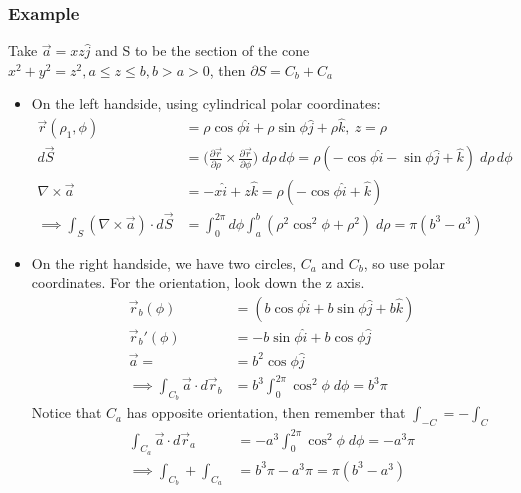 \documentclass[a4paper, 11pt, normalem]{report}
\newcommand\p{\partial}
\newcommand\vr{\vec{r}}
\newcommand\vs{\vec{S}}
\newcommand\va{\vec{a}}
\begin{document}
\subsection{Example}
Take $\va = xz\hat{j}$ and S to be the section of the cone $x^2 + y^2 = z^2, a \leq z \leq b, b > a > 0$, then $\p S = C_b + C_a$
\begin{itemize}
    \item On the left handside, using cylindrical polar coordinates:
            \begin{align*}
                \vr(\rho_1, \phi) &= \rho\cos\phi \hat{i} + \rho\sin\phi \hat{j} + \rho \hat{k},~ z = \rho \\
                d\vs &= \Big(\frac{\p \vr}{\p \rho} \times \frac{\p \vr}{\p \phi}\Big)\;d\rho\,d\phi = \rho(-\cos\phi \hat{i} - \sin\phi \hat{j} + \hat{k})\;d\rho\,d\phi \\
                \nabla \times \va &= -x\hat{i} + z\hat{k} = \rho(-\cos\phi \hat{i} + \hat{k}) \\
                \implies \int_S (\nabla \times \va)\cdot d\vs &= \int_0^{2\pi} d\phi \int_a^b  (\rho^2 \cos^2\phi + \rho^2)\;d\rho = \pi (b^3 - a^3)
            \end{align*}
    \item On the right handside, we have two circles, $C_a$ and $C_b$, so use polar coordinates. For the orientation, look down the z axis.
            \begin{align*}
                \vr_b(\phi) &= (b\cos\phi \hat{i} + b\sin\phi \hat{j} + b\hat{k}) \\
                \vr_b'(\phi) &= -b\sin\phi \hat{i} + b\cos\phi\hat{j} \\
                \va = &= b^2\cos\phi \hat{j} \\
                \implies \int_{C_b} \va \cdot d\vr_b &= b^3 \int_0^{2\pi} \cos^2\phi\;d\phi = b^3 \pi
            \end{align*}
            Notice that $C_a$ has opposite orientation, then remember that $\int_{-C} = -\int_C$
            \begin{align*}
                \int_{C_a} \va \cdot d\vr_a &= -a^3\int_0^{2\pi} \cos^2\phi\;d\phi = -a^3 \pi \\
                \implies \int_{C_b} + \int_{C_a} &= b^3 \pi - a^3 \pi = \pi(b^3 - a^3)
            \end{align*}
\end{itemize}

\chapter{}
\end{document}
